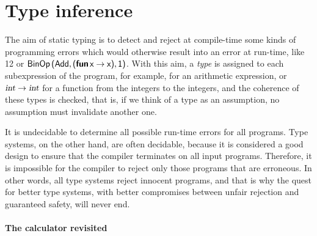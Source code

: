 \section{Type inference}

The aim of static typing is to detect and reject at compile\hyp{}time
some kinds of programming errors which would otherwise result into an
error at run\hyp{}time, like \lpar\num{1}\rpar{}\lpar\num{2}\rpar{} or
$\textsf{BinOp} \, \textsf{(}\textsf{Add}, \textsf{(}\textsf{\textbf{fun}} \, \textsf{x} \rightarrow
\textsf{x}\textsf{)}, \textsf{1}\textsf{)}$. With this aim, a \emph{type} is
assigned to each subexpression of the program, for example, 
for an arithmetic expression, or $\textsl{int} \rightarrow \textsl{int}$
for a function from the integers to the integers, and the coherence of
these types is checked, that is, if we think of a type as an
assumption, no assumption must invalidate another one.

It is undecidable to determine all possible run\hyp{}time errors for
all programs. Type systems, on the other hand, are often decidable,
because it is considered a good design to ensure that the compiler
terminates on all input programs. Therefore, it is impossible for the
compiler to reject only those programs that are erroneous. In other
words, all type systems reject innocent programs, and that is why the
quest for better type systems, with better compromises between unfair
rejection and guaranteed safety, will never end.

\paragraph{The calculator revisited}

